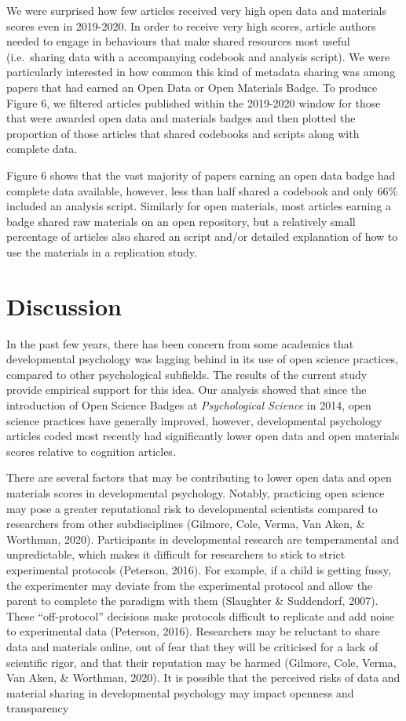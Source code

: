 \documentclass[
  english,
  man,floatsintext]{apa6}
\begin{document}
We were surprised how few articles received very high open data and materials scores even in 2019-2020. In order to receive very high scores, article authors needed to engage in behaviours that make shared resources most useful (i.e.~sharing data with a accompanying codebook and analysis script). We were particularly interested in how common this kind of metadata sharing was among papers that had earned an Open Data or Open Materials Badge. To produce Figure 6, we filtered articles published within the 2019-2020 window for those that were awarded open data and materials badges and then plotted the proportion of those articles that shared codebooks and scripts along with complete data.

Figure 6 shows that the vast majority of papers earning an open data badge had complete data available, however, less than half shared a codebook and only 66\% included an analysis script. Similarly for open materials, most articles earning a badge shared raw materials on an open repository, but a relatively small percentage of articles also shared an script and/or detailed explanation of how to use the materials in a replication study.

\hypertarget{discussion}{%
\section{Discussion}\label{discussion}}

In the past few years, there has been concern from some academics that developmental psychology was lagging behind in its use of open science practices, compared to other psychological subfields. The results of the current study provide empirical support for this idea. Our analysis showed that since the introduction of Open Science Badges at \emph{Psychological Science} in 2014, open science practices have generally improved, however, developmental psychology articles coded most recently had significantly lower open data and open materials scores relative to cognition articles.

There are several factors that may be contributing to lower open data and open materials scores in developmental psychology. Notably, practicing open science may pose a greater reputational risk to developmental scientists compared to researchers from other subdisciplines (Gilmore, Cole, Verma, Van Aken, \& Worthman, 2020). Participants in developmental research are temperamental and unpredictable, which makes it difficult for researchers to stick to strict experimental protocols (Peterson, 2016). For example, if a child is getting fussy, the experimenter may deviate from the experimental protocol and allow the parent to complete the paradigm with them (Slaughter \& Suddendorf, 2007). These ``off-protocol'' decisions make protocols difficult to replicate and add noise to experimental data (Peterson, 2016). Researchers may be reluctant to share data and materials online, out of fear that they will be criticised for a lack of scientific rigor, and that their reputation may be harmed (Gilmore, Cole, Verma, Van Aken, \& Worthman, 2020). It is possible that the perceived risks of data and material sharing in developmental psychology may impact openness and transparency
\end{document}
